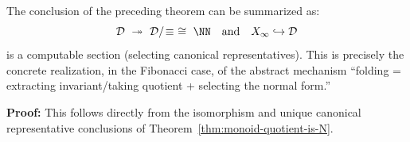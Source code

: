 \begin{corollary}\label{cor:fold-as-section}
The conclusion of the preceding theorem can be summarized as:
\[
\mathcal{D}\ \twoheadrightarrow\ \mathcal{D}/\!\equiv\ \cong\ \NN
\quad\text{and}\quad
X_\infty \hookrightarrow \mathcal{D}
\]
is a computable section (selecting canonical representatives). This is precisely the concrete realization, in the Fibonacci case, of the abstract mechanism ``folding = extracting invariant/taking quotient + selecting the normal form.''
\end{corollary}

\textbf{Proof:}
This follows directly from the isomorphism and unique canonical representative conclusions of Theorem~\ref{thm:monoid-quotient-is-N}.
